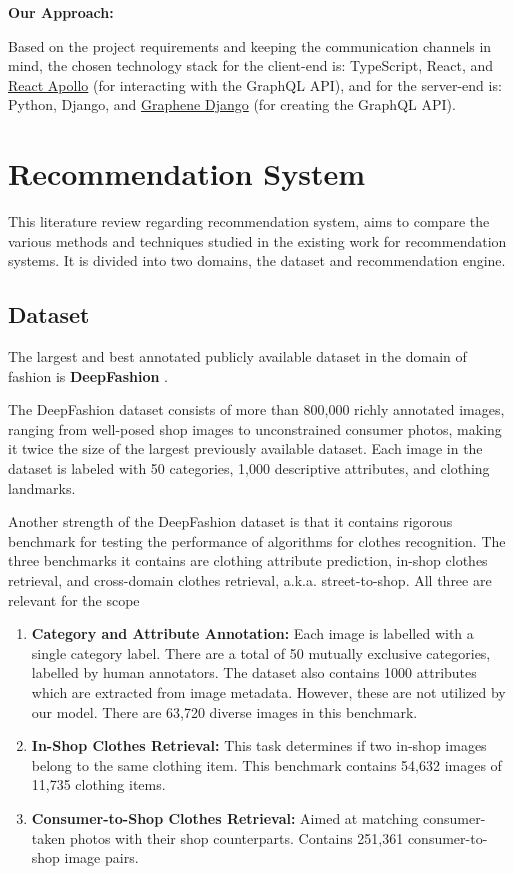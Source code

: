 \noindent\textbf{Our Approach:} 

\noindent Based on the project requirements and keeping the communication channels in mind, the chosen technology stack for the client-end is: TypeScript, React, and \href{https://github.com/apollographql/react-apollo}{React Apollo} (for interacting with the GraphQL API), and for the server-end is: Python, Django, and \href{https://github.com/graphql-python/graphene-django}{Graphene Django} (for creating the GraphQL API).

\section{Recommendation System}
This literature review regarding recommendation system, aims to compare the various methods and techniques studied in the existing work for recommendation systems. It is divided into two domains, the dataset and recommendation engine.

\subsection{Dataset}
The largest and best annotated publicly available dataset in the domain of fashion is \textbf{DeepFashion} \cite{deepfashion}.

The DeepFashion dataset consists of more than 800,000 richly annotated images, ranging from well-posed shop images to unconstrained consumer photos, making it twice the size of the largest previously available dataset. Each image in the dataset is labeled with 50 categories, 1,000 descriptive attributes, and clothing landmarks.

Another strength of the DeepFashion dataset is that it contains rigorous benchmark for testing the performance of algorithms for clothes recognition. The three benchmarks it contains are clothing attribute prediction, in-shop clothes retrieval, and cross-domain clothes retrieval, a.k.a. street-to-shop. All three are relevant for the scope 

\begin{enumerate}
	\item \textbf{Category and Attribute Annotation:} Each image is labelled with a single category label. There are a total of 50 mutually exclusive categories, labelled by human annotators. The dataset also contains 1000 attributes which are extracted from image metadata. However, these are not utilized by our model. There are 63,720 diverse images in this benchmark.
	
	\item \textbf{In-Shop Clothes Retrieval:} This task determines if two in-shop images belong to the same clothing item. This benchmark contains 54,632 images of 11,735 clothing items.  
	
	\item \textbf{Consumer-to-Shop Clothes Retrieval:} Aimed at matching consumer-taken photos with their shop counterparts. Contains 251,361 consumer-to-shop image pairs.
\end{enumerate}

